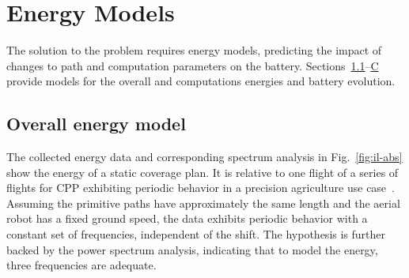 \documentclass[letterpaper,10pt,journal,twoside]{IEEEtran}
\theoremstyle{definition}
\newtheorem*{pb}{Problem}%
\begin{document}


\section{Energy Models}  %
\label{sec:energy-model} %
The solution to the problem requires energy models, predicting the impact of changes to path and computation parameters on the battery. %
Sections~\ref{sec:mod-mot}--\hyperref[sec:mod-bat]{C} provide models for the overall and computations energies {\color{blue}and }%
battery evolution.

\subsection{Overall energy model%
}
\label{sec:mod-mot}

The collected energy data and corresponding spectrum analysis in Fig.~\ref{fig:il-abs} show the energy of a static coverage plan. It is relative to one flight of a series of flights for CPP exhibiting periodic behavior in a precision agriculture use case~\cite{seewald2020mechanical}. %
Assuming the primitive paths have approximately the same length and the aerial robot has a fixed ground speed, the data exhibits periodic behavior with a constant set of frequencies, independent of the shift. The hypothesis is further backed by the power spectrum analysis, indicating that to model the energy, three frequencies are adequate.

\end{document}
